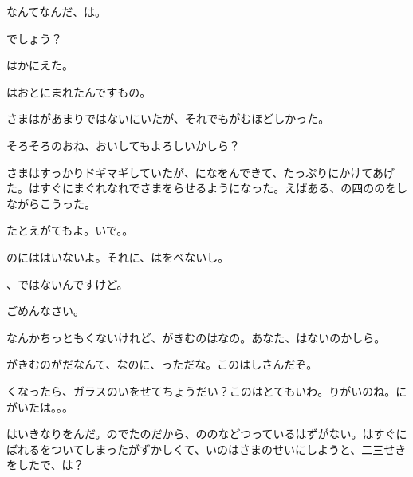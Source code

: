 なんてなんだ、は。

でしょう？

はかにえた。

はおとにまれたんですもの。

さまはがあまりではないにいたが、それでもがむほどしかった。

そろそろのおね、おいしてもよろしいかしら？

さまはすっかりドギマギしていたが、になをんできて、たっぷりにかけてあげた。はすぐにまぐれなれでさまをらせるようになった。えばある、の四ののをしながらこうった。

たとえがてもよ。いで。。

のにははいないよ。それに、はをべないし。

、ではないんですけど。

ごめんなさい。

なんかちっともくないけれど、がきむのはなの。あなた、はないのかしら。

がきむのがだなんて、なのに、っただな。このはしさんだぞ。

くなったら、ガラスのいをせてちょうだい？このはとてもいわ。りがいのね。にがいたは。。。

はいきなりをんだ。のでたのだから、ののなどつっているはずがない。はすぐにばれるをついてしまったがずかしくて、いのはさまのせいにしようと、二三せきをしたで、は？

